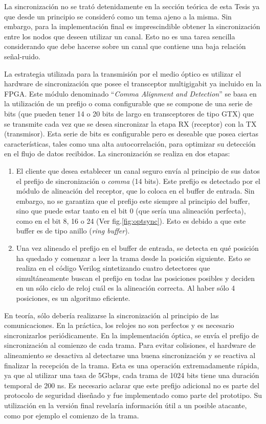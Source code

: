 La sincronización no se trató detenidamente en la sección teórica de esta Tesis ya que desde un principio se consideró como un tema ajeno a la misma. Sin embargo, para la implementación final es imprescindible obtener la sincronización entre los nodos que deseen utilizar un canal. Esto no es una tarea sencilla considerando que debe hacerse sobre un canal que contiene una baja relación señal-ruido.

La estrategia utilizada para la transmisión por el medio óptico es utilizar el hardware de sincronización que posee el transceptor multigigabit ya incluido en la FPGA. Este módulo \cite{ug198} denominado ``\textit{Comma Alignment and Detection}'' se basa en la utilización de un prefijo o coma configurable que se compone de una serie de bits (que pueden tener 14 o 20 bits de largo en transceptores de tipo GTX) que se transmite cada vez que se desea sincronizar la etapa RX (receptor) con la TX (transmisor). Esta serie de bits es configurable pero es deseable que posea ciertas características, tales como una alta autocorrelación, para optimizar su detección en el flujo de datos recibidos.
La sincronización se realiza en dos etapas:
\begin{enumerate}
 \item El cliente que desea establecer un canal seguro envía al principio de sus datos el prefijo de sincronización o \textit{comma} (14 bits). Este prefijo es detectado por el módulo de alineación del receptor, que lo coloca en el buffer de entrada. Sin embargo, no se garantiza que el prefijo este siempre al principio del buffer, sino que puede estar tanto en el bit 0 (que sería una alineación perfecta), como en el bit 8, 16 o 24 (Ver fig.\ref{fig:optsync}). Esto es debido a que este buffer es de tipo anillo (\textit{ring buffer}).
 \item Una vez alineado el prefijo en el buffer de entrada, se detecta en qué posición ha quedado y comenzar a leer la trama desde la posición siguiente. Esto se realiza en el código Verilog sintetizando cuatro detectores que simultáneamente buscan el prefijo en todas las posiciones posibles y deciden en un sólo ciclo de reloj cuál es la alineación correcta. Al haber sólo 4 posiciones, es un algoritmo eficiente.
\end{enumerate}

En teoría, sólo debería realizarse la sincronización al principio de las comunicaciones. En la práctica, los relojes no son perfectos y es necesario sincronizarlos periódicamente. En la implementación óptica, se envía el prefijo de sincronización al comienzo de cada trama.
Para evitar colisiones, el hardware de alineamiento se desactiva al detectarse una buena sincronización y se reactiva al finalizar la recepción de la trama. Esta es una operación extremadamente rápida, ya que al utilizar una tasa de 5Gbps, cada trama de 1024 bits tiene una duración temporal de 200 ns. Es necesario aclarar que este prefijo adicional no es parte del protocolo de seguridad diseñado y fue implementado como parte del prototipo. Su utilización en la versión final revelaría información útil a un posible atacante, como por ejemplo el comienzo de la trama.

